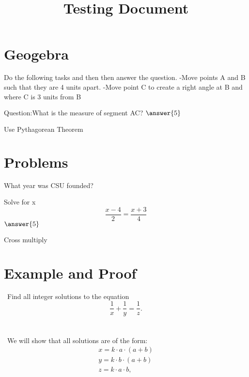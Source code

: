 \documentclass{ximera}
\title{Testing Document}
\begin{document}
\maketitle
\section{Geogebra}
\begin{problem}
Do the following tasks and then then answer the question.
    -Move points A and B such that they are 4 units apart.
    -Move point C to create a right angle at B and where C is 3 units from B
    
Question:What is the measure of segment AC?
$\answer{5}$
\begin{hint}
Use Pythagorean Theorem
\end{hint}
\end{problem}
\section{Problems}
\begin{problem}
\begin{multipleChoice}
What year was CSU founded?
\end{multipleChoice}
\begin{problem}
Solve for x
 \[\frac{x-4}{2}=\frac{x+3}{4}\]
$\answer{5}$
\begin{hint}
Cross multiply
\end{hint}
\end{problem}
\end{problem}
\section{Example and Proof}
\noindent \ Find all integer solutions to the equation
$$ \frac{1}{x} + \frac{1}{y} = \frac{1}{z}. $$ \\ \\

\noindent \ We will show that all solutions are of the form:
$$ \begin{array}{l}
x = k \cdot a \cdot \left(a + b\right) \\
y = k \cdot b \cdot \left(a + b\right) \\
z = k \cdot a \cdot b,
\end{array} $$
\end{document}

